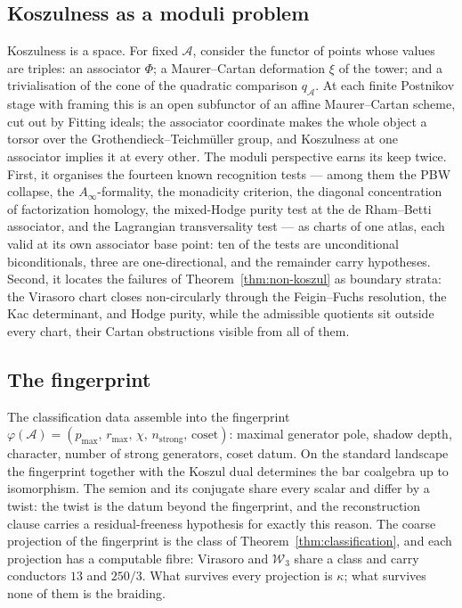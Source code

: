 \documentclass[11pt]{amsart}
\numberwithin{equation}{section}
\theoremstyle{plain}
\theoremstyle{definition}
\theoremstyle{remark}
\newcommand{\cA}{\mathcal{A}}
\newcommand{\cW}{\mathcal{W}}
\begin{document}
\subsection{Koszulness as a moduli problem}

Koszulness is a space. For fixed $\cA$, consider
the functor of points whose values are triples: an associator
$\Phi$; a Maurer--Cartan deformation $\xi$ of the tower; and a
trivialisation of the cone of the quadratic comparison
$q_{\cA}$. At each finite Postnikov stage with framing this is an
open subfunctor of an affine Maurer--Cartan scheme, cut out by
Fitting ideals; the associator coordinate makes the whole object a
torsor over the Grothendieck--Teichm\"uller group, and Koszulness at
one associator implies it at every other. The moduli perspective
earns its keep twice. First, it organises the fourteen known
recognition tests --- among them the PBW collapse, the
$A_\infty$-formality, the monadicity criterion, the diagonal
concentration of factorization homology, the mixed-Hodge purity
test at the de Rham--Betti associator, and the Lagrangian
transversality test --- as charts of one atlas, each valid at its
own associator base point: ten of the tests are unconditional
biconditionals, three are one-directional, and the remainder carry
hypotheses. Second, it locates the failures of
Theorem~\ref{thm:non-koszul} as boundary strata: the Virasoro chart
closes non-circularly through the Feigin--Fuchs resolution, the Kac
determinant, and Hodge purity, while the admissible quotients sit
outside every chart, their Cartan obstructions visible from all of
them.

\subsection{The fingerprint}

The classification data assemble into the fingerprint
$\varphi(\cA)=(p_{\max},\allowbreak\,r_{\max},\allowbreak\,\chi,\allowbreak\,n_{\mathrm{strong}},\allowbreak\,
\text{coset})$: maximal generator pole, shadow depth, character,
number of strong generators, coset datum. On the standard landscape
the fingerprint together with the Koszul dual determines the bar
coalgebra up to isomorphism. The semion and its conjugate share
every scalar and differ by a twist: the twist is the datum beyond
the fingerprint, and the reconstruction clause carries a
residual-freeness hypothesis for exactly this reason. The coarse
projection of the fingerprint is the class of
Theorem~\ref{thm:classification}, and each projection has a
computable fibre: Virasoro and $\cW_3$ share a class and carry
conductors $13$ and $250/3$. What survives every projection is
$\kappa$; what survives none of them is the braiding.
\end{document}
